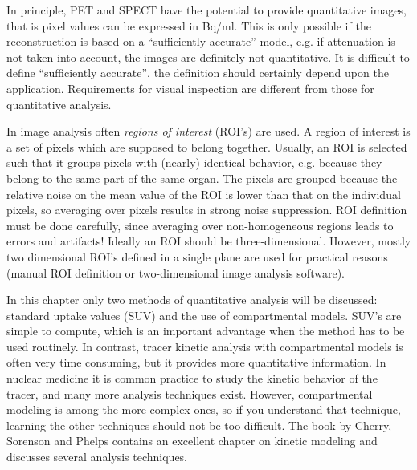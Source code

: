 \documentclass[11pt,oneside]{book}
\begin{document}
In principle, PET and SPECT have the potential to provide quantitative images,
that is pixel values can be expressed in Bq/ml. This is only possible if the
reconstruction is based on a ``sufficiently accurate'' model, e.g. if
attenuation is not taken into account, the images are definitely not
quantitative. It is difficult to define ``sufficiently accurate'', the
definition should certainly depend upon the application. Requirements for
visual inspection are different from those for quantitative analysis.

In image analysis often {\em regions of interest} (ROI's) are used. A region
of interest is a set of pixels which are supposed to belong together. Usually,
an ROI is selected such that it groups pixels with (nearly) identical
behavior, e.g. because they belong to the same part of the same organ. The
pixels are grouped because the relative noise on the mean value of the ROI is
lower than that on the individual pixels, so averaging over pixels results in
strong noise suppression. ROI definition must be done carefully, since
averaging over non-homogeneous regions leads to errors and artifacts! Ideally
an ROI should be three-dimensional. However, mostly two dimensional ROI's
defined in a single plane are used for practical reasons (manual ROI
definition or two-dimensional image analysis software).

In this chapter only two methods of quantitative analysis will be
discussed: standard uptake values (SUV) and the use of compartmental
models. SUV's are simple to compute, which is an important advantage
when the method has to be used routinely. In contrast, tracer kinetic
analysis with compartmental models is often very time consuming, but
it provides more quantitative information.  In nuclear medicine it is
common practice to study the kinetic behavior of the tracer, and many
more analysis techniques exist. However, compartmental modeling is
among the more complex ones, so if you understand that technique,
learning the other techniques should not be too difficult.  The book
by Cherry, Sorenson and Phelps \cite{Cherry} contains an excellent
chapter on kinetic modeling and discusses several analysis techniques.
\end{document}
